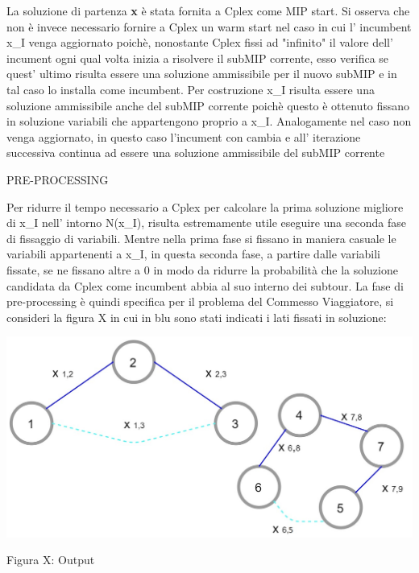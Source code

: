 \documentclass[11pt]{article}
\begin{document}
La soluzione di partenza \textbf{x} è stata fornita a Cplex come MIP start. Si osserva che non è invece necessario fornire a Cplex un warm start nel caso in cui l' incumbent x_I venga aggiornato poichè, nonostante Cplex fissi ad "infinito" il valore dell' incument ogni qual volta inizia a risolvere il subMIP corrente, esso verifica se quest' ultimo risulta essere una soluzione ammissibile per il nuovo subMIP e in tal caso lo installa come incumbent. Per costruzione x_I risulta essere una soluzione ammissibile anche del subMIP corrente poichè questo è ottenuto fissano in soluzione variabili che appartengono proprio a x_I. Analogamente nel caso non venga aggiornato, in questo caso l'incument con cambia e all' iterazione successiva continua ad essere una soluzione ammissibile del subMIP corrente

\vspace{2\baselineskip}
PRE-PROCESSING
\vspace{2\baselineskip} 

Per ridurre il tempo necessario a Cplex per calcolare la prima soluzione migliore di x_I nell' intorno N(x_I), risulta estremamente utile eseguire una seconda fase di fissaggio di variabili. Mentre nella prima fase si fissano in maniera casuale le variabili appartenenti a x_I, in questa seconda fase, a partire dalle variabili fissate, se ne fissano altre a 0 in modo da ridurre la probabilità che la soluzione candidata da Cplex come incumbent abbia al suo interno dei subtour. La fase di pre-processing è quindi specifica per il problema del Commesso Viaggiatore, si consideri la figura X in cui in blu sono stati indicati i lati fissati in soluzione:

\begin{center}
\includegraphics[scale=0.5]{PreProcessing}  

Figura X: Output 

\end{center}
\end{document}
